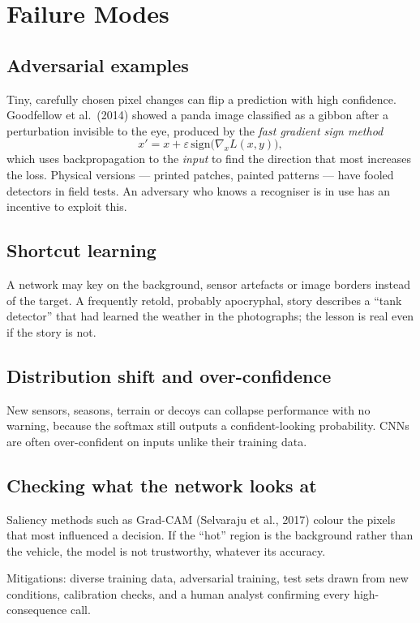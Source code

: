 \documentclass[11pt]{article}
\begin{document}
\section{Failure Modes}
\subsection{Adversarial examples}
Tiny, carefully chosen pixel changes can flip a prediction with high confidence. Goodfellow et al.\ (2014) showed a panda image classified as a gibbon after a perturbation invisible to the eye, produced by the \emph{fast gradient sign method}
\[x'=x+\varepsilon\,\text{sign}\big(\nabla_xL(x,y)\big),\]
which uses backpropagation to the \emph{input} to find the direction that most increases the loss. Physical versions --- printed patches, painted patterns --- have fooled detectors in field tests. An adversary who knows a recogniser is in use has an incentive to exploit this.
\subsection{Shortcut learning}
A network may key on the background, sensor artefacts or image borders instead of the target. A frequently retold, probably apocryphal, story describes a ``tank detector'' that had learned the weather in the photographs; the lesson is real even if the story is not.
\subsection{Distribution shift and over-confidence}
New sensors, seasons, terrain or decoys can collapse performance with no warning, because the softmax still outputs a confident-looking probability. CNNs are often over-confident on inputs unlike their training data.
\subsection{Checking what the network looks at}
Saliency methods such as Grad-CAM (Selvaraju et al., 2017) colour the pixels that most influenced a decision. If the ``hot'' region is the background rather than the vehicle, the model is not trustworthy, whatever its accuracy.
\begin{keypoint}
Mitigations: diverse training data, adversarial training, test sets drawn from new conditions, calibration checks, and a human analyst confirming every high-consequence call.
\end{keypoint}
\end{document}
